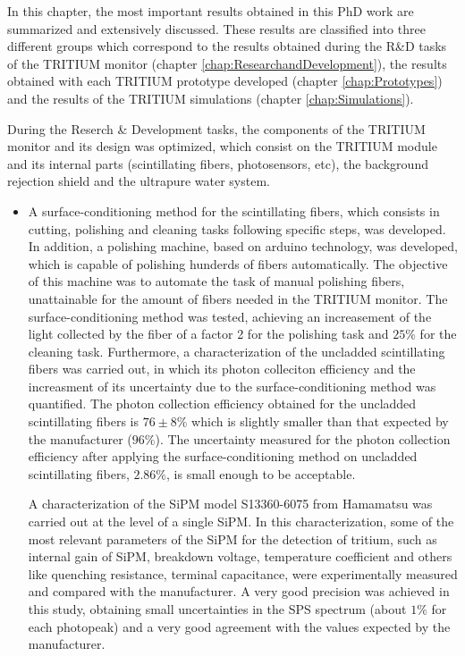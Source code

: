 In this chapter, the most important results obtained in this PhD work are summarized and extensively discussed. These results are classified into three different groups which correspond to the results obtained during the R\&D tasks of the TRITIUM monitor (chapter \ref{chap:ResearchandDevelopment}), the results obtained with each TRITIUM prototype developed (chapter \ref{chap:Prototypes}) and the results of the TRITIUM simulations (chapter \ref{chap:Simulations}).

During the Reserch \& Development tasks, the components of the TRITIUM monitor and its design was optimized, which consist on the TRITIUM module and its internal parts (scintillating fibers, photosensors, etc), the background rejection shield and the ultrapure water system. 

\begin{itemize}
\item{} A surface-conditioning method for the scintillating fibers, which consists in cutting, polishing and cleaning tasks following specific steps, was developed. In addition, a polishing machine, based on arduino technology, was developed, which is capable of polishing hunderds of fibers automatically. The objective of this machine was to automate the task of manual polishing fibers, unattainable for the amount of fibers needed in the TRITIUM monitor. The surface-conditioning method was tested, achieving an increasement of the light collected by the fiber of a factor 2 for the polishing task and $25\%$ for the cleaning task. Furthermore, a characterization of the uncladded scintillating fibers was carried out, in which its photon colleciton efficiency and the increasment of its uncertainty due to the surface-conditioning method was quantified. The photon collection efficiency obtained for the uncladded scintillating fibers is $76\pm 8\%$ which is slightly smaller than that expected by the manufacturer ($96\%$). The uncertainty measured for the photon collection efficiency after applying the surface-conditioning method on uncladded scintillating fibers, $2.86\%$, is small enough to be acceptable.

A characterization of the SiPM model S13360-6075 from Hamamatsu was carried out at the level of a single SiPM. In this characterization, some of the most relevant parameters of the SiPM for the detection of tritium, such as internal gain of SiPM, breakdown voltage, temperature coefficient and others like quenching resistance, terminal capacitance, were experimentally measured and compared with the manufacturer. A very good precision was achieved in this study, obtaining small uncertainties in the SPS spectrum (about $1\%$ for each photopeak) and a very good agreement with the values expected by the manufacturer.


\end{itemize}
